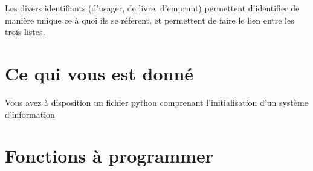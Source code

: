 \documentclass[10pt,a4paper,onecolumn]{article}
\begin{document}
Les divers identifiants (d'usager, de livre, d'emprunt) permettent d'identifier de manière unique ce à quoi ils se réfèrent, et permettent de faire le lien entre les trois listes. 

\section{Ce qui vous est donné}

Vous avez à disposition un fichier python comprenant l'initialisation d'un système d'information


\section{Fonctions à programmer}
\end{document}
